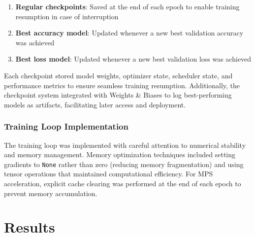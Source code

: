 \documentclass[12pt, a4paper]{article}
\begin{document}
\begin{enumerate}
    \item \textbf{Regular checkpoints}: Saved at the end of each epoch to enable training resumption in case of interruption
    \item \textbf{Best accuracy model}: Updated whenever a new best validation accuracy was achieved
    \item \textbf{Best loss model}: Updated whenever a new best validation loss was achieved
\end{enumerate}

Each checkpoint stored model weights, optimizer state, scheduler state, and performance metrics to ensure seamless training resumption. Additionally, the checkpoint system integrated with Weights \& Biases to log best-performing models as artifacts, facilitating later access and deployment.

\subsubsection{Training Loop Implementation}

The training loop was implemented with careful attention to numerical stability and memory management. Memory optimization techniques included setting gradients to \texttt{None} rather than zero (reducing memory fragmentation) and using tensor operations that maintained computational efficiency. For MPS acceleration, explicit cache clearing was performed at the end of each epoch to prevent memory accumulation.

\section{Results}





\end{document}

